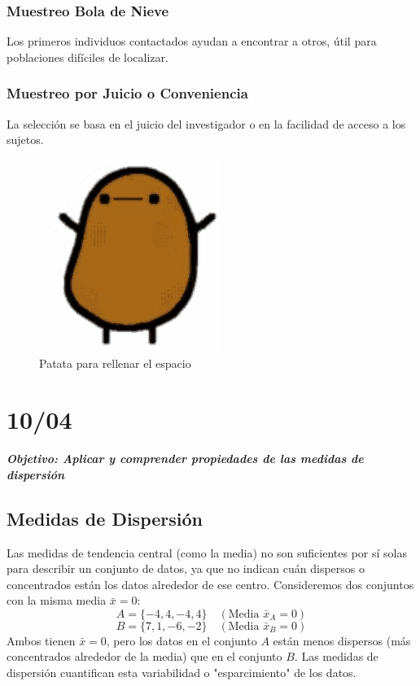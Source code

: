 \documentclass[12pt, letterpaper]{article}
\begin{document}
\subsubsection{Muestreo Bola de Nieve}
Los primeros individuos contactados ayudan a encontrar a otros, útil para poblaciones difíciles de localizar.

\subsubsection{Muestreo por Juicio o Conveniencia}
La selección se basa en el juicio del investigador o en la facilidad de acceso a los sujetos.
\bigskip

\begin{figure}[htbp]
    \centering
    \includegraphics[width=0.75\linewidth]{patata}
    \caption{Patata para rellenar el espacio}
    \label{fig:patata}
\end{figure}
\newpage

\section{10/04}
\textbf{\textit{Objetivo: Aplicar y comprender propiedades de las medidas de dispersión}}
\subsection{Medidas de Dispersión}
Las medidas de tendencia central (como la media) no son suficientes por sí solas para describir un conjunto de datos, ya que no indican cuán dispersos o concentrados están los datos alrededor de ese centro. Consideremos dos conjuntos con la misma media $\bar{x}=0$:
\[ A = \{-4, 4, -4, 4\} \quad (\text{Media } \bar{x}_A = 0) \]
\[ B = \{7, 1, -6, -2\} \quad (\text{Media } \bar{x}_B = 0) \]
Ambos tienen $\bar{x}=0$, pero los datos en el conjunto $A$ están menos dispersos (más concentrados alrededor de la media) que en el conjunto $B$. Las medidas de dispersión cuantifican esta variabilidad o "esparcimiento" de los datos.
\end{document}
